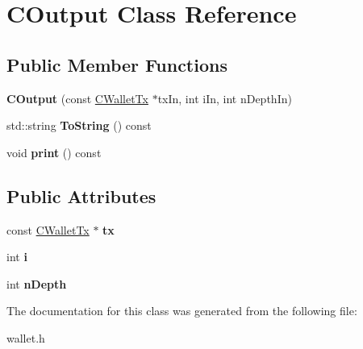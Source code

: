 \hypertarget{class_c_output}{}\section{C\+Output Class Reference}
\label{class_c_output}
\subsection*{Public Member Functions}
\begin{DoxyCompactItemize}
\item 
\mbox{\label{class_c_output_a2e77709700bcd889f2f37037a63942fe}} 
{\bfseries C\+Output} (const \mbox{\hyperlink{class_c_wallet_tx}{C\+Wallet\+Tx}} $\ast$tx\+In, int i\+In, int n\+Depth\+In)
\item 
\mbox{\label{class_c_output_ad80664c1a4a4cc36e8bd52077b1bd4db}} 
std\+::string {\bfseries To\+String} () const
\item 
\mbox{\label{class_c_output_ad16a9ea0e4d2be46a7a537c65154e7a1}} 
void {\bfseries print} () const
\end{DoxyCompactItemize}
\subsection*{Public Attributes}
\begin{DoxyCompactItemize}
\item 
\mbox{\label{class_c_output_ad5c15e7a2dc48258127b8fd5db421ad5}} 
const \mbox{\hyperlink{class_c_wallet_tx}{C\+Wallet\+Tx}} $\ast$ {\bfseries tx}
\item 
\mbox{\label{class_c_output_ae1b3534a41afb09bb04a499017f2821e}} 
int {\bfseries i}
\item 
\mbox{\label{class_c_output_a2eb24fc73c35fcc551b736d68bd1c64a}} 
int {\bfseries n\+Depth}
\end{DoxyCompactItemize}


The documentation for this class was generated from the following file\+:\begin{DoxyCompactItemize}
\item 
wallet.\+h\end{DoxyCompactItemize}
